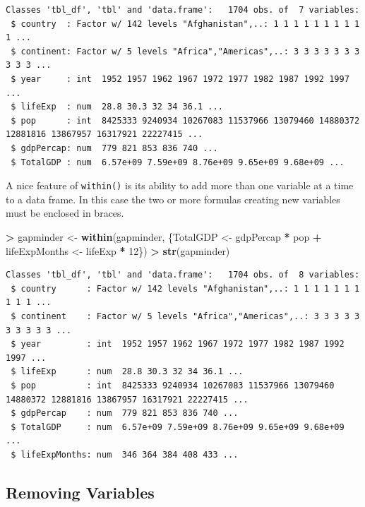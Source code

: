 \documentclass[]{krantz}
\makeatletter
\newenvironment{Shaded}{\begin{snugshade}}{\end{snugshade}}
\newcommand{\DecValTok}[1]{\textcolor[rgb]{0.06,0.06,0.06}{#1}}
\newcommand{\KeywordTok}[1]{\textcolor[rgb]{0.27,0.27,0.27}{\textbf{#1}}}
\newcommand{\NormalTok}[1]{#1}
\newcommand{\OperatorTok}[1]{\textcolor[rgb]{0.43,0.43,0.43}{\textbf{#1}}}
\newcommand{\StringTok}[1]{\textcolor[rgb]{0.5,0.5,0.5}{#1}}
\newenvironment{kframe}{%
\medskip{}
\setlength{\fboxsep}{.8em}
 \def\at@end@of@kframe{}%
 \ifinner\ifhmode%
  \def\at@end@of@kframe{\end{minipage}}%
  \begin{minipage}{\columnwidth}%
 \fi\fi%
 \def\FrameCommand##1{\hskip\@totalleftmargin \hskip-\fboxsep
 \colorbox{shadecolor}{##1}\hskip-\fboxsep
     \hskip-\linewidth \hskip-\@totalleftmargin \hskip\columnwidth}%
 \MakeFramed {\advance\hsize-\width
   \@totalleftmargin\z@ \linewidth\hsize
   \@setminipage}}%
 {\par\unskip\endMakeFramed%
 \at@end@of@kframe}
\renewenvironment{Shaded}{\begin{kframe}}{\end{kframe}}
\makeatother
\begin{document}
\begin{verbatim}
Classes 'tbl_df', 'tbl' and 'data.frame':   1704 obs. of  7 variables:
 $ country  : Factor w/ 142 levels "Afghanistan",..: 1 1 1 1 1 1 1 1 1 1 ...
 $ continent: Factor w/ 5 levels "Africa","Americas",..: 3 3 3 3 3 3 3 3 3 3 ...
 $ year     : int  1952 1957 1962 1967 1972 1977 1982 1987 1992 1997 ...
 $ lifeExp  : num  28.8 30.3 32 34 36.1 ...
 $ pop      : int  8425333 9240934 10267083 11537966 13079460 14880372 12881816 13867957 16317921 22227415 ...
 $ gdpPercap: num  779 821 853 836 740 ...
 $ TotalGDP : num  6.57e+09 7.59e+09 8.76e+09 9.65e+09 9.68e+09 ...
\end{verbatim}

A nice feature of \texttt{within()} is its ability to add more than one variable at a time to a data frame. In this case the two or more formulas creating new variables must be enclosed in braces.

\begin{Shaded}
\begin{Highlighting}[]
\OperatorTok{>}\StringTok{ }\NormalTok{gapminder <-}\StringTok{ }\KeywordTok{within}\NormalTok{(gapminder, \{TotalGDP <-}\StringTok{ }\NormalTok{gdpPercap }\OperatorTok{*}\StringTok{ }\NormalTok{pop}
\OperatorTok{+}\StringTok{     }\NormalTok{lifeExpMonths <-}\StringTok{ }\NormalTok{lifeExp }\OperatorTok{*}\StringTok{ }\DecValTok{12}\NormalTok{\})}
\OperatorTok{>}\StringTok{ }\KeywordTok{str}\NormalTok{(gapminder)}
\end{Highlighting}
\end{Shaded}

\begin{verbatim}
Classes 'tbl_df', 'tbl' and 'data.frame':   1704 obs. of  8 variables:
 $ country      : Factor w/ 142 levels "Afghanistan",..: 1 1 1 1 1 1 1 1 1 1 ...
 $ continent    : Factor w/ 5 levels "Africa","Americas",..: 3 3 3 3 3 3 3 3 3 3 ...
 $ year         : int  1952 1957 1962 1967 1972 1977 1982 1987 1992 1997 ...
 $ lifeExp      : num  28.8 30.3 32 34 36.1 ...
 $ pop          : int  8425333 9240934 10267083 11537966 13079460 14880372 12881816 13867957 16317921 22227415 ...
 $ gdpPercap    : num  779 821 853 836 740 ...
 $ TotalGDP     : num  6.57e+09 7.59e+09 8.76e+09 9.65e+09 9.68e+09 ...
 $ lifeExpMonths: num  346 364 384 408 433 ...
\end{verbatim}

\hypertarget{removing-variables}{%
\subsection{Removing Variables}\label{removing-variables}}
\end{document}
